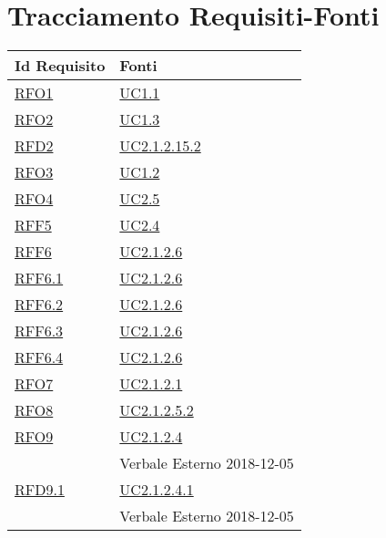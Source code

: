 \section{Tracciamento Requisiti-Fonti}
\normalsize
\begin{longtable}{|>{\centering}m{5cm}|m{5cm}<{\centering}|}
	\hline
	\textbf{Id Requisito} & \textbf{Fonti}\\
	\hline
	\endhead
	\hyperlink{RFO1}{RFO1} & \hyperref[UC1.1]{UC1.1}\\ \hline
	
	\hyperlink{RFO2}{RFO2} & \hyperref[UC1.3]{UC1.3}\\ \hline
	
	\hyperlink{RFD2}{RFD2} & \hyperref[UC2.1.2.15.2]{UC2.1.2.15.2}\\ \hline
	
	\hyperlink{RFO3}{RFO3} & \hyperref[UC1.2]{UC1.2}\\ \hline
	
	\hyperlink{RFO4}{RFO4} & \hyperref[UC2.5]{UC2.5}\\ \hline
	
	\hyperlink{RFF5}{RFF5} & \hyperref[UC2.4]{UC2.4}\\ \hline
	
	\hyperlink{RFF6}{RFF6} & \hyperref[UC2.1.2.6]{UC2.1.2.6}\\ \hline
	
	\hyperlink{RFF6.1}{RFF6.1} & \hyperref[UC2.1.2.6]{UC2.1.2.6}\\ \hline
	
	\hyperlink{RFF6.2}{RFF6.2} & \hyperref[UC2.1.2.6]{UC2.1.2.6}\\ \hline
	
	\hyperlink{RFF6.3}{RFF6.3} & \hyperref[UC2.1.2.6]{UC2.1.2.6}\\ \hline
	
	\hyperlink{RFF6.4}{RFF6.4} & \hyperref[UC2.1.2.6]{UC2.1.2.6}\\ \hline
	
	\hyperlink{RFO7}{RFO7} & \hyperref[UC2.1.2.1]{UC2.1.2.1}\\ \hline
	
	\hyperlink{RFO8}{RFO8} & \hyperref[UC2.1.2.5.2]{UC2.1.2.5.2}\\ \hline
	
	\hyperlink{RFO9}{RFO9} & \hyperref[UC2.1.2.4]{UC2.1.2.4}\\ & Verbale Esterno 2018-12-05\\ \hline
	
	\hyperlink{RFD9.1}{RFD9.1} & \hyperref[UC2.1.2.4.1]{UC2.1.2.4.1}\\ & Verbale Esterno 2018-12-05\\ \hline
	

\end{longtable}
